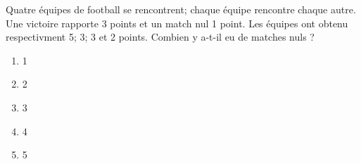 Quatre équipes de football se rencontrent; chaque équipe rencontre
chaque autre. Une victoire rapporte 3 points et un match nul 1
point. Les équipes ont obtenu respectivment 5; 3; 3 et 2
points. Combien y a-t-il eu de matches nuls ?
\begin{multicols}{5}
  \begin{enumerate}[A/]
  \item 1
  \item 2
  \item 3
  \item 4
  \item 5
  \end{enumerate}
\end{multicols}